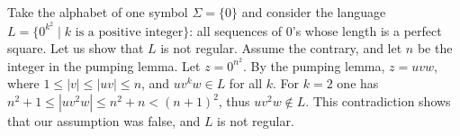 \begin{exl}
Take the alphabet of one symbol $\Sigma = \{0\}$
and consider the language $L = \{0^{k^2} \mid k \text{ is a positive integer}\}$:
all sequences of $0$'s whose length is a perfect square.
Let us show that $L$ is not regular. Assume the contrary, and let $n$ be the integer in the pumping lemma.
Let $z = 0^{n^2}$. By the pumping lemma, $z = uvw$, where $1 \le |v| \le |uv| \le n$, and $uv^kw \in L$ for all $k$.
For $k=2$ one has $n^2+1 \le |uv^2w| \le n^2 + n < (n+1)^2$, thus $uv^2w \notin L$.
This contradiction shows that our assumption was false, and $L$ is not regular.
\end{exl}